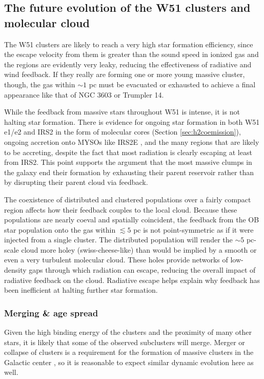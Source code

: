 \subsection{The future evolution of the W51 clusters and molecular cloud}
The W51 clusters are likely to reach a very high star formation efficiency,
since the escape velocity from them is greater than the sound speed in ionized gas
\citep{Matzner2002a,Ginsburg2012a,Bressert2012a,Dale2014a} and
the \hii regions are evidently very leaky, reducing the effectiveness of
radiative and wind feedback.  If they really are
forming one or more
young massive cluster, though, the gas within $\sim 1$ pc must be evacuated or
exhausted to achieve a final appearance like that of NGC 3603 or Trumpler 14.


While the feedback from massive stars throughout W51 is intense, it is not
halting star formation.  There is evidence for ongoing star formation in both
W51 e1/e2 and IRS2 in the form of molecular cores (Section
\ref{sec:h2coemission}), ongoing accretion onto MYSOs like IRS2E
\citep{Figueredo2008a}, and the many \hchii regions that are likely to be
accreting, despite the fact that most radiation is clearly escaping at least
from IRS2.  This point supports the \citet{Matzner2015a} argument that the
most massive clumps in the galaxy  end their formation by exhausting their
parent reservoir rather than by disrupting their parent cloud via feedback.

The coexistence of distributed and clustered populations over a fairly compact
region affects how their feedback couples to the local cloud.  Because these
populations are nearly coeval and spatially coincident, the feedback from the
OB star population onto the gas within $\lesssim5$ pc is not point-symmetric as
if it were injected from a single cluster.  The distributed population will
render the $\sim5$ pc-scale cloud more holey (swiss-cheese-like) than would be
implied by a smooth or even a very turbulent molecular cloud.  These holes
provide networks of low-density gaps through which radiation can escape,
reducing the overall impact of radiative feedback on the cloud.  Radiative
escape helps explain why feedback has been inefficient at halting further star
formation.


\subsubsection{Merging \& age spread}
\label{sec:merging}
Given the high binding energy of the clusters and the proximity of many other
stars, it is likely that some of the observed subclusters will merge.  Merger
or collapse of clusters is a requirement for the formation of massive
clusters in the Galactic center \citep{Walker2015a}, so it is reasonable to
expect similar dynamic evolution here as well.

